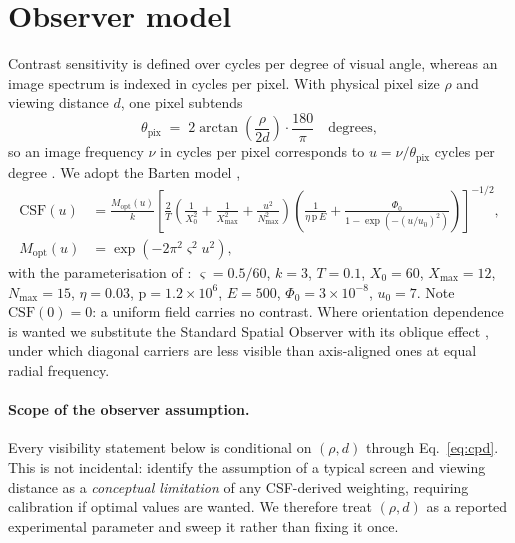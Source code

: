 \documentclass[11pt,a4paper]{article}
\begin{document}
\section{Observer model}

Contrast sensitivity is defined over cycles per degree of visual angle,
whereas an image spectrum is indexed in cycles per pixel. With physical
pixel size $\rho$ and viewing distance $d$, one pixel subtends
\begin{equation}
  \theta_{\mathrm{pix}} \;=\; 2\arctan\!\left(\frac{\rho}{2d}\right)\cdot\frac{180}{\pi}
  \quad\text{degrees},
  \label{eq:cpd}
\end{equation}
so an image frequency $\nu$ in cycles per pixel corresponds to
$u=\nu/\theta_{\mathrm{pix}}$ cycles per degree
\citep[App.~D]{galinska2026csflow}. We adopt the Barten model
\citep{barten2003},
\begin{align}
  \mathrm{CSF}(u) &= \frac{M_{\mathrm{opt}}(u)}{k}
  \left[\frac{2}{T}\!\left(\frac{1}{X_0^{2}}+\frac{1}{X_{\max}^{2}}
  +\frac{u^{2}}{N_{\max}^{2}}\right)
  \!\left(\frac{1}{\eta\,\mathrm{p}\,E}
  +\frac{\Phi_0}{1-\exp(-(u/u_0)^{2})}\right)\right]^{-1/2},
  \label{eq:barten}\\[2pt]
  M_{\mathrm{opt}}(u) &= \exp(-2\pi^{2}\varsigma^{2}u^{2}),
  \label{eq:mopt}
\end{align}
with the parameterisation of \citet[App.~A]{galinska2026csflow}:
$\varsigma=0.5/60$, $k=3$, $T=0.1$, $X_0=60$, $X_{\max}=12$,
$N_{\max}=15$, $\eta=0.03$, $\mathrm{p}=1.2\times10^{6}$, $E=500$,
$\Phi_0=3\times10^{-8}$, $u_0=7$. Note $\mathrm{CSF}(0)=0$: a uniform
field carries no contrast. Where orientation dependence is wanted we
substitute the Standard Spatial Observer with its oblique effect
\citep{watson2005sso}, under which diagonal carriers are less visible
than axis-aligned ones at equal radial frequency.

\paragraph{Scope of the observer assumption.}
Every visibility statement below is conditional on $(\rho,d)$ through
Eq.~\eqref{eq:cpd}. This is not incidental:
\citet[Sec.~6]{galinska2026csflow} identify the assumption of a typical
screen and viewing distance as a \emph{conceptual limitation} of any
CSF-derived weighting, requiring calibration if optimal values are
wanted. We therefore treat $(\rho,d)$ as a reported experimental
parameter and sweep it rather than fixing it once.
\end{document}

